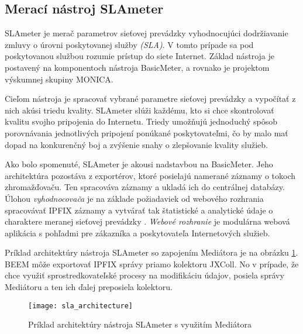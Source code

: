 \subsection{Merací nástroj SLAmeter}

SLAmeter je merač parametrov sieťovej prevádzky vyhodnocujúci dodržiavanie zmluvy o úrovni poskytovanej 
služby \emph{(SLA)}. V tomto prípade sa pod poskytovanou službou rozumie prístup do siete 
Internet. Základ nástroja je postavený na komponentoch nástroja BasicMeter, a rovnako je projektom 
výskumnej skupiny MONICA. 

Cieľom nástroja je spracovať vybrané parametre sieťovej prevádzky a vypočítať z nich akúsi triedu 
kvality. SLAmeter slúži každému, kto si chce skontrolovať kvalitu svojho pripojenia do Internetu. 
Triedy umožňujú jednoduchý spôsob porovnávania jednotlivých pripojení ponúkané poskytovateľmi, 
čo by malo mať dopad na konkurenčný boj a zvýšenie snahy o zlepšovanie kvality služieb. \citep{slameter}

Ako bolo spomenuté, SLAmeter je akousi nadstavbou na BasicMeter. Jeho architektúra pozostáva z exportérov,
ktoré posielajú namerané záznamy o tokoch zhromažďovaču. Ten spracováva záznamy a ukladá ich do 
centrálnej databázy. Úlohou \emph{vyhodnocovača} je na základe požiadaviek od webového rozhrania 
spracovávať IPFIX záznamy a vytvárať tak štatistické a analytické údaje o charaktere 
meranej sieťovej prevádzky \citep{evaluator}. \emph{Webové rozhranie} je modulárna webová aplikácia 
s pohľadmi pre zákazníka a poskytovateľa Internetových služieb.

Príklad architektúry nástroja SLAmeter so zapojením Mediátora je na obrázku \ref{o:sla_architecture}.
BEEM môže exportovať IPFIX správy priamo kolektoru JXColl. No v prípade, že chce využiť sprostredkovateľské 
procesy na modifikáciu údajov, posiela správy Mediátoru a ten ich ďalej preposiela kolektoru.

\begin{figure}[ht!]
\centering
\texttt{[image: sla\_architecture]}
\caption{Príklad architektúry nástroja SLAmeter s využitím Mediátora}\label{o:sla_architecture}
\end{figure}